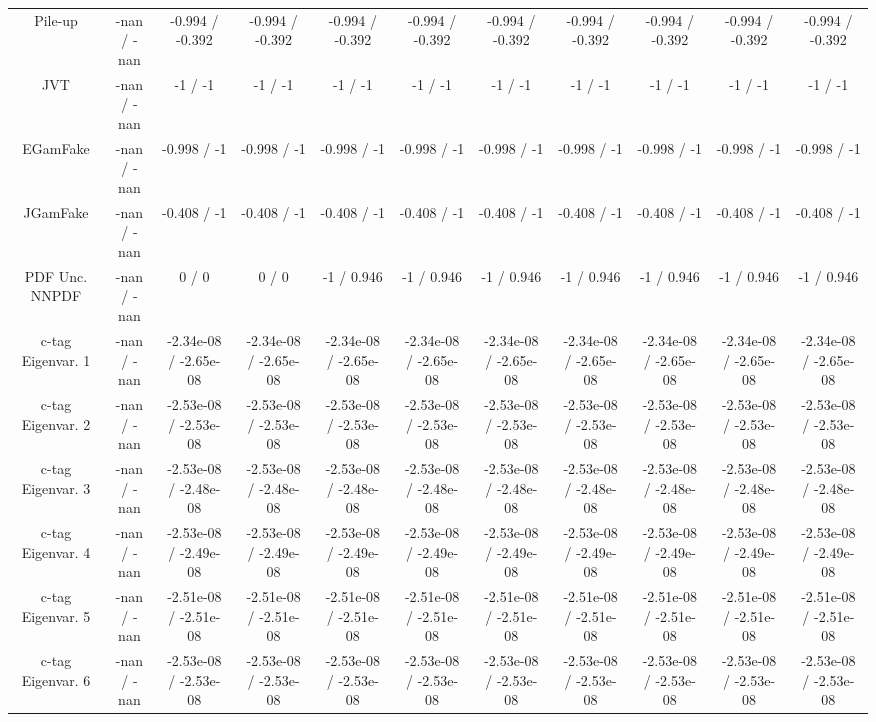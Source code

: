\begin{table}[htbp]
\begin{center}
\begin{tabular}{|c|c|c|c|c|c|c|c|c|c|c|}
  Pile-up & -nan / -nan & -0.994 / -0.392 & -0.994 / -0.392 & -0.994 / -0.392 & -0.994 / -0.392 & -0.994 / -0.392 & -0.994 / -0.392 & -0.994 / -0.392 & -0.994 / -0.392 & -0.994 / -0.392 \\ 
  JVT & -nan / -nan & -1 / -1 & -1 / -1 & -1 / -1 & -1 / -1 & -1 / -1 & -1 / -1 & -1 / -1 & -1 / -1 & -1 / -1 \\ 
  EGamFake & -nan / -nan & -0.998 / -1 & -0.998 / -1 & -0.998 / -1 & -0.998 / -1 & -0.998 / -1 & -0.998 / -1 & -0.998 / -1 & -0.998 / -1 & -0.998 / -1 \\ 
  JGamFake & -nan / -nan & -0.408 / -1 & -0.408 / -1 & -0.408 / -1 & -0.408 / -1 & -0.408 / -1 & -0.408 / -1 & -0.408 / -1 & -0.408 / -1 & -0.408 / -1 \\ 
  PDF Unc. NNPDF & -nan / -nan & 0 / 0 & 0 / 0 & -1 / 0.946 & -1 / 0.946 & -1 / 0.946 & -1 / 0.946 & -1 / 0.946 & -1 / 0.946 & -1 / 0.946 \\ 
  c-tag Eigenvar. 1 & -nan / -nan & -2.34e-08 / -2.65e-08 & -2.34e-08 / -2.65e-08 & -2.34e-08 / -2.65e-08 & -2.34e-08 / -2.65e-08 & -2.34e-08 / -2.65e-08 & -2.34e-08 / -2.65e-08 & -2.34e-08 / -2.65e-08 & -2.34e-08 / -2.65e-08 & -2.34e-08 / -2.65e-08 \\ 
  c-tag Eigenvar. 2 & -nan / -nan & -2.53e-08 / -2.53e-08 & -2.53e-08 / -2.53e-08 & -2.53e-08 / -2.53e-08 & -2.53e-08 / -2.53e-08 & -2.53e-08 / -2.53e-08 & -2.53e-08 / -2.53e-08 & -2.53e-08 / -2.53e-08 & -2.53e-08 / -2.53e-08 & -2.53e-08 / -2.53e-08 \\ 
  c-tag Eigenvar. 3 & -nan / -nan & -2.53e-08 / -2.48e-08 & -2.53e-08 / -2.48e-08 & -2.53e-08 / -2.48e-08 & -2.53e-08 / -2.48e-08 & -2.53e-08 / -2.48e-08 & -2.53e-08 / -2.48e-08 & -2.53e-08 / -2.48e-08 & -2.53e-08 / -2.48e-08 & -2.53e-08 / -2.48e-08 \\ 
  c-tag Eigenvar. 4 & -nan / -nan & -2.53e-08 / -2.49e-08 & -2.53e-08 / -2.49e-08 & -2.53e-08 / -2.49e-08 & -2.53e-08 / -2.49e-08 & -2.53e-08 / -2.49e-08 & -2.53e-08 / -2.49e-08 & -2.53e-08 / -2.49e-08 & -2.53e-08 / -2.49e-08 & -2.53e-08 / -2.49e-08 \\ 
  c-tag Eigenvar. 5 & -nan / -nan & -2.51e-08 / -2.51e-08 & -2.51e-08 / -2.51e-08 & -2.51e-08 / -2.51e-08 & -2.51e-08 / -2.51e-08 & -2.51e-08 / -2.51e-08 & -2.51e-08 / -2.51e-08 & -2.51e-08 / -2.51e-08 & -2.51e-08 / -2.51e-08 & -2.51e-08 / -2.51e-08 \\ 
  c-tag Eigenvar. 6 & -nan / -nan & -2.53e-08 / -2.53e-08 & -2.53e-08 / -2.53e-08 & -2.53e-08 / -2.53e-08 & -2.53e-08 / -2.53e-08 & -2.53e-08 / -2.53e-08 & -2.53e-08 / -2.53e-08 & -2.53e-08 / -2.53e-08 & -2.53e-08 / -2.53e-08 & -2.53e-08 / -2.53e-08 \\ 

\end{tabular}
\end{center}
\end{table}

